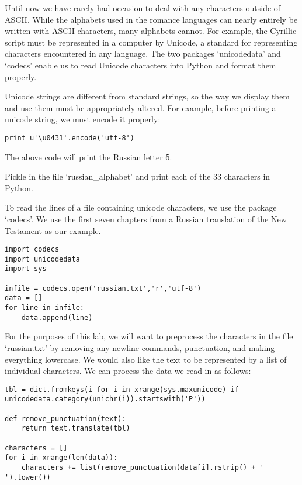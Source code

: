 

Until now we have rarely had occasion to deal with any characters outside of ASCII. While the alphabets used in the romance languages can nearly entirely be written with ASCII characters, many alphabets cannot. For example, the Cyrillic script must be represented in a computer by Unicode, a standard for representing characters encountered in any language. The two packages `unicodedata' and `codecs' enable us to read Unicode characters into Python and format them properly.

Unicode strings are different from standard strings, so the way we display them and use them must be appropriately altered. For example, before printing a unicode string, we must encode it properly:

\begin{lstlisting}[style=python]
print u'\u0431'.encode('utf-8')
\end{lstlisting}

The above code will print the Russian letter б.

\begin{problem}
Pickle in the file `russian\_alphabet' and print each of the $33$ characters in Python.
\end{problem}

To read the lines of a file containing unicode characters, we use the package `codecs'. We use the first seven chapters from a Russian translation of the New Testament as our example.

\begin{lstlisting}[style=python]
import codecs
import unicodedata
import sys

infile = codecs.open('russian.txt','r','utf-8')
data = []
for line in infile:
	data.append(line)
\end{lstlisting}

For the purposes of this lab, we will want to preprocess the characters in the file `russian.txt' by removing any newline commands, punctuation, and making everything lowercase. We would also like the text to be represented by a list of individual characters. We can process the data we read in as follows:

\begin{lstlisting}[style=python]
tbl = dict.fromkeys(i for i in xrange(sys.maxunicode) if unicodedata.category(unichr(i)).startswith('P'))

def remove_punctuation(text):
	return text.translate(tbl)

characters = []
for i in xrange(len(data)):
	characters += list(remove_punctuation(data[i].rstrip() + ' ').lower())
\end{lstlisting}

